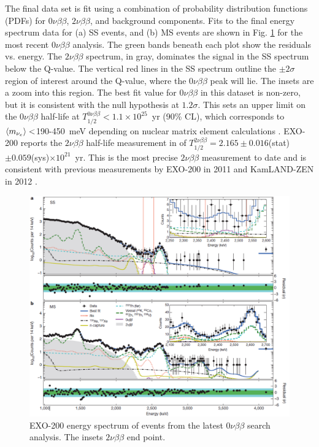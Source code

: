 The final data set is fit using a combination of probability distribution functions (PDFs) for $0\nu\beta\beta$, $2\nu\beta\beta$, and background components.  Fits to the final energy spectrum data for (a) SS events, and (b) MS events are shown in Fig. \ref{fig:exo200data} for the most recent $0\nu\beta\beta$ analysis.  The green bands beneath each plot show the residuals vs. energy.  The $2\nu\beta\beta$ spectrum, in gray, dominates the signal in the SS spectrum below the Q-value.  The vertical red lines in the SS spectrum outline the $\pm 2 \sigma$ region of interest around the Q-value, where the $0\nu\beta\beta$ peak will lie.  The insets are a zoom into this region.  The best fit value for $0\nu\beta\beta$ in this dataset is non-zero, but it is consistent with the null hypothesis at $1.2 \sigma$.  This sets an upper limit on the $0\nu\beta\beta$ half-life at $T^{0\nu\beta\beta}_{1/2} < 1.1 \times 10^{25}$~yr (90\% CL), which corresponds to $\braket{m_{\nu_{e}}} < $190-450~meV depending on nuclear matrix element calculations \cite{EXO2000nuNature}.  EXO-200 reports the $2\nu\beta\beta$ half-life measurement in \cite{EXO200TwoNuLong} of $T^{2\nu\beta\beta}_{1/2} = 2.165 \pm 0.016$(stat)$ \pm 0.059$(sys)$ \times 10^{21}$~yr.  This is the most precise $2\nu\beta\beta$ measurement to date and is consistent with previous measurements by EXO-200 in 2011 \cite{EXO200TwoNuOriginal} and KamLAND-ZEN in 2012 \cite{KamLAND}.

\begin{figure} %
	\centering
	\includegraphics[width=.95\textwidth]{figures/0nu_spectrum_nature.png}
	\caption{EXO-200 energy spectrum of events from the latest $0\nu\beta\beta$ search analysis.  The insets $2\nu\beta\beta$ end point. \cite{EXO2000nuNature}}
\label{fig:exo200data}
\end{figure}

